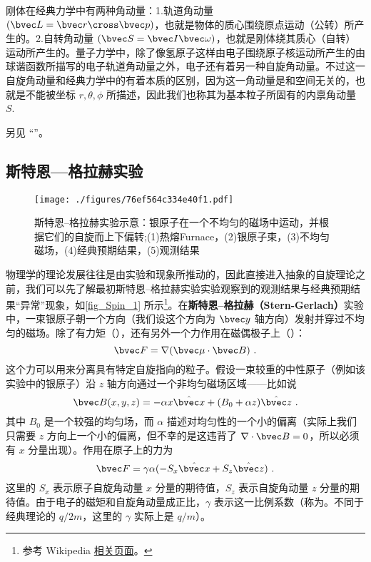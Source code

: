 
\begin{issues}
\issueDraft
\end{issues}


刚体在经典力学中有两种角动量：1.轨道角动量 $(\bvec L = \bvec r\cross\bvec p)$，也就是物体的质心围绕原点运动（公转）所产生的。2.自转角动量 $(\bvec S = \bvec I\bvec\omega)$，也就是刚体绕其质心（自转）运动所产生的。量子力学中，除了像氢原子这样由电子围绕原子核运动所产生的由球谐函数所描写的电子轨道角动量之外，电子还有着另一种自旋角动量。不过这一自旋角动量和经典力学中的有着本质的区别，因为这一角动量是和空间无关的，也就是不能被坐标 $r,\theta,\phi$ 所描述，因此我们也称其为基本粒子所固有的内禀角动量 $S$. 

另见 “”。

\subsection{斯特恩—格拉赫实验}
\begin{figure}[ht]
\centering
\texttt{[image: ./figures/76ef564c334e40f1.pdf]}
\caption{斯特恩–格拉赫实验示意：银原子在一个不均匀的磁场中运动，并根据它们的自旋而上下偏转;(1)热熔Furnace，(2)银原子束，(3)不均匀磁场，(4)经典预期结果，(5)观测结果} \label{fig_Spin_1}
\end{figure}

物理学的理论发展往往是由实验和现象所推动的，因此直接进入抽象的自旋理论之前，我们可以先了解最初斯特恩–格拉赫实验实验观察到的观测结果与经典预期结果“异常”现象，如\autoref{fig_Spin_1} 所示\footnote{参考 Wikipedia \href{https://en.wikipedia.org/wiki/Stern\%E2\%80\%93Gerlach_experiment}{相关页面}。}。在\textbf{斯特恩–格拉赫（Stern-Gerlach）}实验中，一束银原子朝一个方向（我们设这个方向为 $\bvec y$ 轴方向）发射并穿过不均匀的磁场。除了有力矩（），还有另外一个力作用在磁偶极子上（）：
\begin{equation}\label{eq_Spin_1}
\bvec F=\nabla(\bvec \mu\cdot \bvec B)~.
\end{equation}
这个力可以用来分离具有特定自旋指向的粒子。假设一束较重的中性原子（例如该实验中的银原子）沿 $z$ 轴方向通过一个非均匀磁场区域——比如说
\begin{equation}\label{eq_Spin_2}
\bvec B(x,y,z)=-\alpha x \hat{\bvec x}+(B_0+\alpha z)\hat {\bvec z}~.
\end{equation}
其中 $B_0$ 是一个较强的均匀场，而 $\alpha$ 描述对均匀性的一个小的偏离（实际上我们只需要 $z$ 方向上一个小的偏离，但不幸的是这违背了 $\nabla\cdot \bvec B=0$，所以必须有 $x$ 分量出现）。作用在原子上的力为
\begin{equation}
\bvec F=\gamma \alpha (-S_x \hat{\bvec x}+S_z\hat{\bvec z})~.
\end{equation}
这里的 $S_x$ 表示原子自旋角动量 $x$ 分量的期待值，$S_z$ 表示自旋角动量 $z$ 分量的期待值。由于电子的磁矩和自旋角动量成正比，$\gamma$ 表示这一比例系数（称为。不同于经典理论的 $q/2m$，这里的 $\gamma$ 实际上是 $q/m$）。

